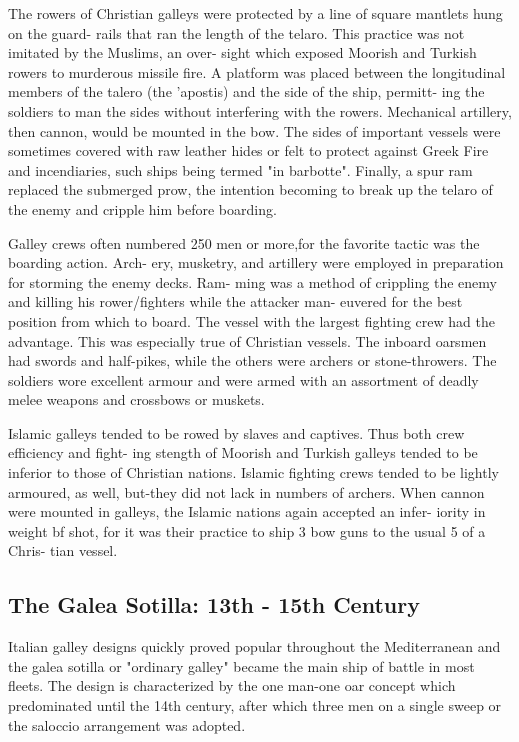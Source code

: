 \documentclass{article}
\begin{document}
\begin{multicols}{2}
The rowers of Christian galleys were protected by a line of square
mantlets hung on the guard- rails that ran the length of the telaro.
This practice was not imitated by the Muslims, an over- sight which
exposed Moorish and Turkish rowers to murderous missile fire.  A
platform was placed between the longitudinal members of the talero
(the 'apostis) and the side of the ship, permitt- ing the soldiers to
man the sides without interfering with the rowers.  Mechanical
artillery, then cannon, would be mounted in the bow.  The sides of
important vessels were sometimes covered with raw leather hides or
felt to protect against Greek Fire and incendiaries, such ships being
termed "in barbotte".  Finally, a spur ram replaced the submerged
prow, the intention becoming to break up the telaro of the enemy and
cripple him before boarding.

Galley crews often numbered 250 men or more,for the favorite tactic
was the boarding action. Arch- ery, musketry, and artillery were
employed in preparation for storming the enemy decks.  Ram- ming was a
method of crippling the enemy and killing his rower/fighters while the
attacker man- euvered for the best position from which to board.  The
vessel with the largest fighting crew had the advantage.  This was
especially true of Christian vessels.  The inboard oarsmen had swords
and half-pikes, while the others were archers or stone-throwers.  The
soldiers wore excellent armour and were armed with an assortment of
deadly melee weapons and crossbows or muskets.

Islamic galleys tended to be rowed by slaves and captives.  Thus both
crew efficiency and fight- ing stength of Moorish and Turkish galleys
tended to be inferior to those of Christian nations.  Islamic fighting
crews tended to be lightly armoured, as well, but-they did not lack in
numbers of archers.  When cannon were mounted in galleys, the Islamic
nations again accepted an infer- iority in weight bf shot, for it was
their practice to ship 3 bow guns to the usual 5 of a Chris- tian
vessel.

\subsection{The Galea Sotilla:  13th - 15th Century}

Italian galley designs quickly proved popular throughout the
Mediterranean and the galea sotilla or "ordinary galley" became the
main ship of battle in most fleets.  The design is characterized by
the one man-one oar concept which predominated until the 14th century,
after which three men on a single sweep or the saloccio arrangement
was adopted.


\end{multicols}
\end{document}
